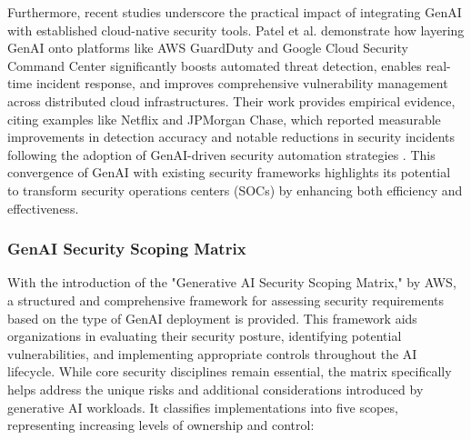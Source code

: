 Furthermore, recent studies underscore the practical impact of integrating GenAI with established cloud-native security tools. Patel et al. \cite{patel_generative_2025} demonstrate how layering GenAI onto platforms like AWS GuardDuty and Google Cloud Security Command Center significantly boosts automated threat detection, enables real-time incident response, and improves comprehensive vulnerability management across distributed cloud infrastructures. Their work provides empirical evidence, citing examples like Netflix and JPMorgan Chase, which reported measurable improvements in detection accuracy and notable reductions in security incidents following the adoption of GenAI-driven security automation strategies \cite{patel_generative_2025}. This convergence of GenAI with existing security frameworks highlights its potential to transform security operations centers (SOCs) by enhancing both efficiency and effectiveness.


\subsubsection{GenAI Security Scoping Matrix} %
\label{sec: GenAI Security Scoping Matrix}

With the introduction of the "Generative AI Security Scoping Matrix," by AWS, a structured and comprehensive framework for assessing security requirements based on the type of GenAI deployment is provided\cite{noauthor_securing_nodate}. This framework aids organizations in evaluating their security posture, identifying potential vulnerabilities, and implementing appropriate controls throughout the AI lifecycle\cite{noauthor_securing_nodate}. While core security disciplines remain essential, the matrix specifically helps address the unique risks and additional considerations introduced by generative AI workloads\cite{noauthor_securing_nodate}. It classifies implementations into five scopes, representing increasing levels of ownership and control\cite{noauthor_securing_2023}:

